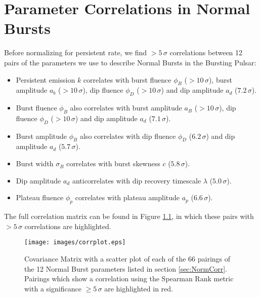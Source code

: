 \chapter{Parameter Correlations in Normal Bursts}
\label{app:corr}

\par Before normalizing for persistent rate, we find $>5\,\sigma$ correlations between 12 pairs of the parameters we use to describe Normal Bursts in the Bursting Pulsar:

\begin{itemize}
\item Persistent emission $k$ correlates with burst fluence $\phi_B$ ($>10\,\sigma$), burst amplitude $a_b$ ($>10\,\sigma$), dip fluence $\phi_D$ ($>10\,\sigma$) and dip amplitude $a_d$ ($7.2\,\sigma$).
\item Burst fluence $\phi_B$ also correlates with burst amplitude $a_B$ ($>10\,\sigma$), dip fluence $\phi_D$ ($>10\,\sigma$) and dip amplitude $a_d$ ($7.1\,\sigma$).
\item Burst amplitude $\phi_B$ also correlates with dip fluence $\phi_D$ ($6.2\,\sigma$) and dip amplitude $a_d$ ($5.7\,\sigma$).
\item Burst width $\sigma_B$ correlates with burst skewness $c$ ($5.8\,\sigma$).
\item Dip amplitude $a_d$ anticorrelates with dip recovery timescale $\lambda$ ($5.0\,\sigma$).
\item Plateau fluence $\phi_p$ correlates with plateau amplitude $a_p$ ($6.6\,\sigma$).
\end{itemize}

The full correlation matrix can be found in Figure \ref{fig:corr}, in which these pairs with $>5\,\sigma$ correlations are highlighted.

\begin{figure}
  \centering
  \texttt{[image: images/corrplot.eps]}
  \caption[Covariance Matrix with a scatter plot of each of the 66 pairings of the 12 Normal Burst parameters listed in section \ref{sec:NormCorr}]{Covariance Matrix with a scatter plot of each of the 66 pairings of the 12 Normal Burst parameters listed in section \ref{sec:NormCorr}.  Pairings which show a correlation using the Spearman Rank metric with a significance $\geq5\,\sigma$ are highlighted in red.}
  \label{fig:corr}
\end{figure}

